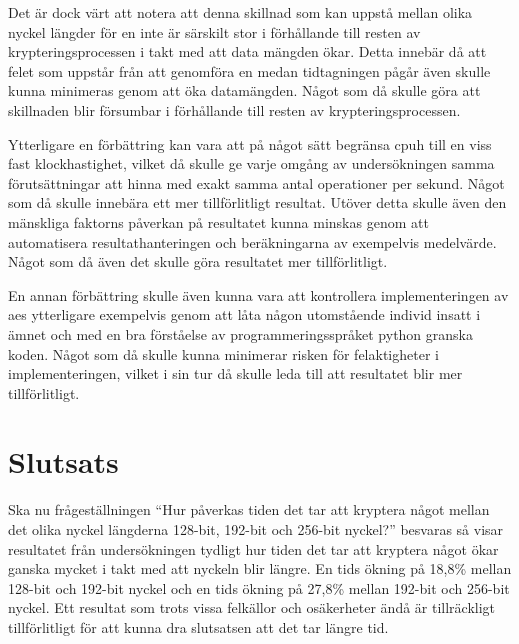 Det är dock värt att notera att denna skillnad som kan uppstå mellan olika nyckel längder för en inte är särskilt stor i förhållande till resten av krypteringsprocessen
i takt med att data mängden ökar. Detta innebär då att felet som uppstår från att genomföra en medan tidtagningen pågår även skulle kunna minimeras genom att
öka datamängden. Något som då skulle göra att skillnaden blir försumbar i förhållande till resten av krypteringsprocessen.%

Ytterligare en förbättring kan vara att på något sätt begränsa \gls{cpuh} till en viss fast klockhastighet, vilket då skulle ge varje omgång av undersökningen samma förutsättningar
att hinna med exakt samma antal operationer per sekund. Något som då skulle innebära ett mer tillförlitligt resultat. Utöver detta skulle även den mänskliga faktorns påverkan på resultatet kunna minskas
genom att automatisera resultathanteringen och beräkningarna av exempelvis medelvärde. Något som då även det skulle göra resultatet mer tillförlitligt. %

En annan förbättring skulle även kunna vara att kontrollera implementeringen av \acrshort{aes} ytterligare exempelvis genom att låta någon utomstående individ insatt i ämnet och
med en bra förståelse av programmeringsspråket \gls{python} granska koden. Något som då skulle kunna minimerar risken för felaktigheter i implementeringen,
vilket i sin tur då skulle leda till att resultatet blir mer tillförlitligt. %

\section{Slutsats} %
\label{sec:conclusion}
Ska nu frågeställningen “Hur påverkas tiden det tar att kryptera något mellan det olika nyckel längderna 128-bit, 192-bit och 256-bit nyckel?” besvaras så visar resultatet från
undersökningen tydligt hur tiden det tar att kryptera något ökar ganska mycket i takt med att nyckeln blir längre. En tids ökning på 18,8\% mellan 128-bit och 192-bit nyckel och en tids ökning på 27,8\%
mellan 192-bit och 256-bit nyckel. Ett resultat som trots vissa felkällor och osäkerheter ändå är tillräckligt tillförlitligt för att kunna dra slutsatsen att det tar längre tid.

